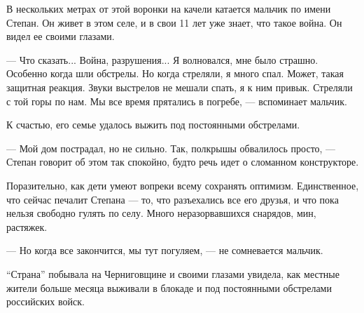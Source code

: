 
В нескольких метрах от этой воронки на качели катается мальчик по имени Степан.
Он живет в этом селе, и в свои 11 лет уже знает, что такое война. Он видел ее
своими глазами. 

— Что сказать... Война, разрушения... Я волновался, мне было страшно. Особенно
когда шли обстрелы. Но когда стреляли, я много спал. Может, такая защитная
реакция. Звуки выстрелов не мешали спать, я к ним привык. Стреляли с той горы
по нам. Мы все время прятались в погребе, — вспоминает мальчик. 

К счастью, его семье удалось выжить под постоянными обстрелами. 

— Мой дом пострадал, но не сильно. Так, полкрышы обвалилось просто, — Степан
говорит об этом так спокойно, будто речь идет о сломанном конструкторе. 

Поразительно, как дети умеют вопреки всему сохранять оптимизм. Единственное,
что сейчас печалит Степана — то, что разъехались все его друзья, и что пока
нельзя свободно гулять по селу. Много неразорвавшихся снарядов, мин, растяжек. 

— Но когда все закончится, мы тут погуляем, — не сомневается мальчик.

\enquote{Страна} побывала на Черниговщине и своими глазами увидела, как местные жители
больше месяца выживали в блокаде и под постоянными обстрелами российских войск. 

